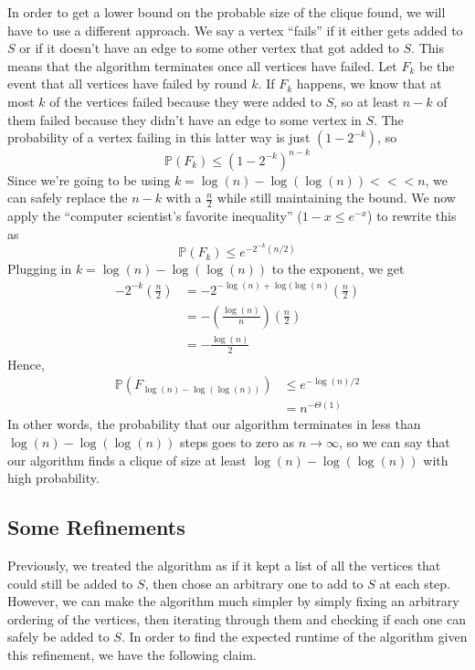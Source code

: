 \documentclass{article}
\begin{document}
In order to get a lower bound on the probable size of the clique found, we will have to use a different approach.  We say a vertex ``fails'' if it either gets added to $S$ or if it doesn't have an edge to some other vertex that got added to $S$.  This means that the algorithm terminates once all vertices have failed.  Let $F_k$ be the event that all vertices have failed by round $k$.  If $F_k$ happens, we know that at most $k$ of the vertices failed because they were added to $S$, so at least $n - k$ of them failed because they didn't have an edge to some vertex in $S$.  The probability of a vertex failing in this latter way is just $(1 - 2^{-k})$, so
$$\mathbb{P}(F_k) \leq (1 - 2^{-k})^{n - k}$$
Since we're going to be using $k = \log(n) - \log(\log(n)) <<< n$, we can safely replace the $n - k$ with a $\frac{n}{2}$ while still maintaining the bound.  We now apply the ``computer scientist's favorite inequality'' ($1 - x \leq e^{-x}$) to rewrite this as
$$\mathbb{P}(F_k) \leq e^{-2^{-k}(n/2)}$$
Plugging in $k = \log(n) - \log(\log(n))$ to the exponent, we get
\begin{align*}
-2^{-k}\left( \frac{n}{2} \right) &= -2^{-\log(n) + \log(\log(n)} \left( \frac{n}{2} \right) \\
&= -\left( \frac{\log(n)}{n} \right) \left( \frac{n}{2} \right) \\
&= -\frac{\log(n)}{2}
\end{align*}
Hence,
\begin{align*}
\mathbb{P}(F_{\log(n) - \log(\log(n))}) &\leq e^{-\log(n)/2} \\
&= n^{-\Theta(1)}
\end{align*}
In other words, the probability that our algorithm terminates in less than $\log(n) - \log(\log(n))$ steps goes to zero as $n \to \infty$, so we can say that our algorithm finds a clique of size at least $\log(n) - \log(\log(n))$ with high probability.

\subsection{Some Refinements}

Previously, we treated the algorithm as if it kept a list of all the vertices that could still be added to $S$, then chose an arbitrary one to add to $S$ at each step.  However, we can make the algorithm much simpler by simply fixing an arbitrary ordering of the vertices, then iterating through them and checking if each one can safely be added to $S$.  In order to find the expected runtime of the algorithm given this refinement, we have the following claim.
\end{document}
